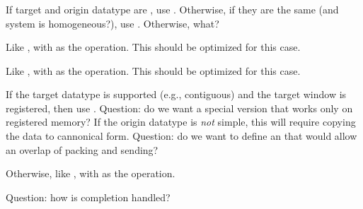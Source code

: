 \documentclass{article}
\begin{document}
\subsubsection{}
\begin{adi3}
\begin{mmadi}If target and origin datatype are
, use 
  .  Otherwise, if they are the same (and system is
  homogeneous?), use .  
  Otherwise, what?

\begin{tcp}
Like , with  as the operation. 
This should be optimized for this case.  
\end{tcp}

\begin{shmem}
Like , with  as the operation.  
This should be optimized for this case.  
\end{shmem}

\begin{via}
If the target datatype is supported (e.g., contiguous) and the target window
is registered, then use .  Question: do we want a
special version that works only on registered memory?  If the origin datatype
is \emph{not} simple, this will require copying the data to cannonical form.
Question: do we want to define an  that would
allow an overlap of packing and sending?

Otherwise, like , with  as the
operation.  

Question: how is completion handled?
\end{via}

\end{mmadi}
\end{adi3}
\end{document}
